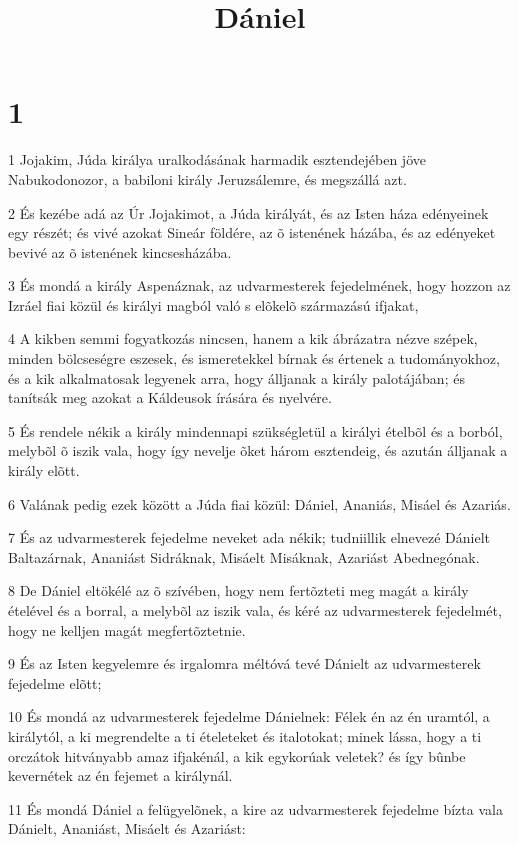 

\title{Dániel}


\chapter{1}

\par 1 Jojakim, Júda királya uralkodásának harmadik esztendejében jöve Nabukodonozor, a babiloni király Jeruzsálemre, és megszállá azt.
\par 2 És kezébe adá az Úr Jojakimot, a Júda királyát, és az Isten háza edényeinek egy részét; és vivé azokat Sineár földére, az õ istenének házába, és az edényeket bevivé az õ istenének kincsesházába.
\par 3 És mondá a király Aspenáznak, az udvarmesterek fejedelmének, hogy hozzon az Izráel fiai közül és királyi magból való s elõkelõ származású ifjakat,
\par 4 A kikben semmi fogyatkozás nincsen, hanem a kik ábrázatra nézve szépek, minden bölcseségre eszesek, és ismeretekkel bírnak és értenek a tudományokhoz, és a kik alkalmatosak legyenek arra, hogy álljanak a király palotájában; és tanítsák meg azokat a Káldeusok írására és nyelvére.
\par 5 És rendele nékik a király mindennapi szükségletül a királyi ételbõl és a borból, melybõl õ iszik vala, hogy így nevelje õket három esztendeig, és azután álljanak a király elõtt.
\par 6 Valának pedig ezek között a Júda fiai közül: Dániel, Ananiás, Misáel és Azariás.
\par 7 És az udvarmesterek fejedelme neveket ada nékik; tudniillik elnevezé Dánielt Baltazárnak, Ananiást Sidráknak, Misáelt Misáknak, Azariást Abednegónak.
\par 8 De Dániel eltökélé az õ szívében, hogy nem fertõzteti meg magát a király ételével és a borral, a melybõl az iszik vala, és kéré az udvarmesterek fejedelmét, hogy ne kelljen magát megfertõztetnie.
\par 9 És az Isten kegyelemre és irgalomra méltóvá tevé Dánielt az udvarmesterek fejedelme elõtt;
\par 10 És mondá az udvarmesterek fejedelme Dánielnek: Félek én az én uramtól, a királytól, a ki megrendelte a ti ételeteket és italotokat; minek lássa, hogy a ti orczátok hitványabb amaz ifjakénál, a kik egykorúak veletek? és így bûnbe kevernétek az én fejemet a királynál.
\par 11 És mondá Dániel a felügyelõnek, a kire az udvarmesterek fejedelme bízta vala Dánielt, Ananiást, Misáelt és Azariást:
